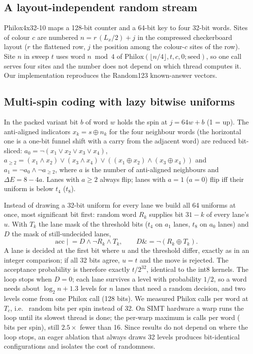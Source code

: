 \documentclass[11pt]{article}
\begin{document}
\subsection{A layout-independent random stream}
Philox4x32-10 \citep{Salmon2011} maps a 128-bit counter and a 64-bit key to four 32-bit words.
Sites of colour $c$ are numbered $n=r\,(L_x/2)+j$ in the compressed checkerboard layout
($r$ the flattened row, $j$ the position among the colour-$c$ sites of the row). Site $n$ in
sweep $t$ uses word $n\bmod4$ of $\mathrm{Philox}(\lfloor n/4\rfloor,t,c,0;\mathrm{seed})$, so
one call serves four sites and the number does not depend on which thread computes it. Our
implementation reproduces the Random123 known-answer vectors.

\subsection{Multi-spin coding with lazy bitwise uniforms}
In the packed variant bit $b$ of word $w$ holds the spin at $j=64w+b$ (1 = up). The
anti-aligned indicators $x_k=s\oplus n_k$ for the four neighbour words (the horizontal one is a
one-bit funnel shift with a carry from the adjacent word) are reduced bit-sliced:
$a_0=\lnot(x_1\lor x_2\lor x_3\lor x_4)$, $a_{\ge2}=(x_1\land x_2)\lor(x_3\land
x_4)\lor((x_1\oplus x_2)\land(x_3\oplus x_4))$ and $a_1=\lnot a_0\land\lnot a_{\ge2}$, where
$a$ is the number of anti-aligned neighbours and $\Delta E=8-4a$. Lanes with $a\ge2$ always flip;
lanes with $a=1$ ($a=0$) flip iff their uniform is below $t_4$ ($t_8$).

Instead of drawing a 32-bit uniform for every lane we build all 64 uniforms at once, most
significant bit first: random word $R_k$ supplies bit $31-k$ of every lane's $u$. With
$T_k$ the lane mask of the threshold bits ($t_4$ on $a_1$ lanes, $t_8$ on $a_0$ lanes) and $D$
the mask of still-undecided lanes,
\begin{equation}
\mathrm{acc}\mathrel{|}=D\land\lnot R_k\land T_k,\qquad D\mathrel{\&}=\lnot(R_k\oplus T_k).
\end{equation}
A lane is decided at the first bit where $u$ and the threshold differ, exactly as in an integer
comparison; if all 32 bits agree, $u=t$ and the move is rejected. The acceptance probability is
therefore exactly $t/2^{32}$, identical to the int8 kernels. The loop stops when $D=0$; each
lane survives a level with probability $1/2$, so a word needs about $\log_2 n+1.3$ levels for
$n$ lanes that need a random decision, and two levels come from one Philox call (128 bits). We
measured \callsPerWord{} Philox calls per word at $T_c$, i.e.\ \bitsPerSpin{} random bits per
spin instead of 32. On SIMT hardware a warp runs the loop until its slowest thread is done; the
per-warp maximum is \callsPerWordWarp{} calls per word (\bitsPerSpinWarp{} bits per spin), still
$2.5\times$ fewer than 16. Since results do not depend on where the loop stops, an eager ablation
that always draws 32 levels produces bit-identical configurations and isolates the cost of
randomness.
\end{document}
